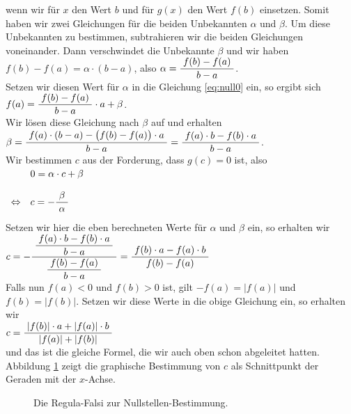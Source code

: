 wenn wir f\"ur $x$ den Wert $b$ und f\"ur $g(x)$ den Wert $f(b)$ einsetzen.  Somit haben wir zwei
Gleichungen f\"ur die beiden Unbekannten $\alpha$ und $\beta$.  Um diese Unbekannten zu bestimmen,
subtrahieren wir die beiden Gleichungen voneinander.  Dann verschwindet die Unbekannte $\beta$ und wir haben
\\[0.2cm]
\hspace*{1.3cm}
   $f(b) - f(a) = \alpha \cdot (b-a)$, \quad also \quad $\alpha = \displaystyle\frac{\;\displaystyle f(b) - f(a)\;}{\;\displaystyle b-a\;}$.
\\[0.2cm]
Setzen wir diesen Wert f\"ur $\alpha$ in die Gleichung \ref{eq:null0} ein, so ergibt sich
\\[0.2cm]
\hspace*{1.3cm}
  $f(a) = \displaystyle\frac{\;\displaystyle f(b) - f(a)\;}{\;\displaystyle b-a\;} \cdot a + \beta$.
\\[0.2cm]
Wir l\"osen diese Gleichung nach $\beta$ auf und erhalten
\\[0.2cm]
\hspace*{1.3cm}
 $\beta = \displaystyle\frac{\;\displaystyle f(a)\cdot (b-a) - \bigl(f(b) - f(a)\bigr)\cdot a\;}{\;\displaystyle b-a\;} = \displaystyle\frac{\;\displaystyle f(a)\cdot b - f(b)\cdot a\;}{\;\displaystyle b-a\;}$. 
\\[0.2cm]
 Wir bestimmen $c$ aus der Forderung, dass $g(c) = 0$ ist, also
\\[0.2cm]
\hspace*{1.3cm}
$
\begin{array}[t]{ll}
                & 0 = \alpha \cdot c + \beta \\[0.4cm]
\Leftrightarrow & c = - \displaystyle\frac{\;\displaystyle\beta\;}{\;\displaystyle\alpha\;} \\[0.4cm]
\end{array}
$
\\[0.2cm]
Setzen wir hier die eben berechneten Werte f\"ur $\alpha$ und $\beta$ ein, so erhalten wir
\\[0.2cm]
\hspace*{1.3cm}
$c = - \displaystyle\frac{\;\displaystyle\displaystyle\frac{\;\displaystyle f(a)\cdot b - f(b)\cdot a\;}{\;\displaystyle b-a\;}\;}{\;\displaystyle\displaystyle\frac{\;\displaystyle f(b) - f(a)\;}{\;\displaystyle b-a\;}\;} = 
   \displaystyle\frac{\;\displaystyle f(b)\cdot a - f(a)\cdot b\;}{\;\displaystyle f(b) - f(a)\;}$
\\[0.2cm]
Falls nun $f(a) < 0$ und $f(b) > 0$ ist, gilt $-f(a) = |f(a)|$ und $f(b) = |f(b)|$.
Setzen wir diese Werte in die obige Gleichung ein, so erhalten wir
\\[0.2cm]
\hspace*{1.3cm}
$c  = \displaystyle\frac{\;\displaystyle|f(b)|\cdot a + |f(a)|\cdot b\;}{\;\displaystyle|f(a)| + |f(b)|\;}$
\\[0.2cm] 
und das ist die gleiche Formel, die wir auch oben schon abgeleitet hatten.
Abbildung \ref{fig:regula-falsi} zeigt die graphische Bestimmung von $c$
als Schnittpunkt der Geraden mit der $x$-Achse.
\begin{figure}[!h]
  \centering
   \caption{Die Regula-Falsi zur Nullstellen-Bestimmung.}
  \label{fig:regula-falsi}
\end{figure}


